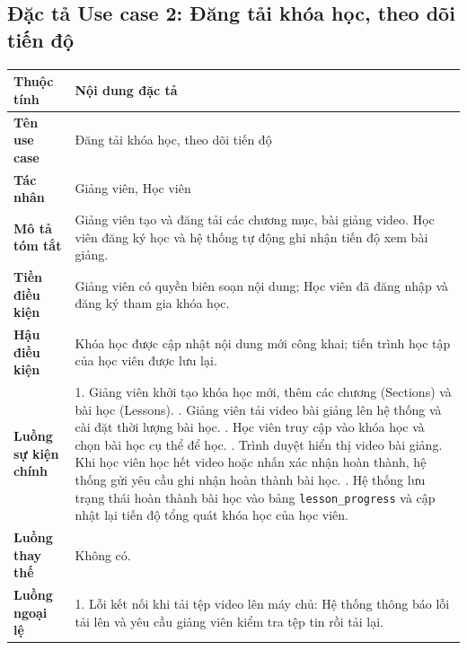 \documentclass[../DoAn.tex]{subfiles}
\begin{document}
\subsection{Đặc tả Use case 2: Đăng tải khóa học, theo dõi tiến độ}
\nopagebreak
\begingroup
\centering
\fontsize{11pt}{14pt}\selectfont
\begin{tabular}{|p{3.2cm}|p{10.8cm}|}
\hline
\textbf{Thuộc tính} & \textbf{Nội dung đặc tả} \\ \hline
\textbf{Tên use case} & Đăng tải khóa học, theo dõi tiến độ \\ \hline
\textbf{Tác nhân} & Giảng viên, Học viên \\ \hline
\textbf{Mô tả tóm tắt} & Giảng viên tạo và đăng tải các chương mục, bài giảng video. Học viên đăng ký học và hệ thống tự động ghi nhận tiến độ xem bài giảng. \\ \hline
\textbf{Tiền điều kiện} & Giảng viên có quyền biên soạn nội dung; Học viên đã đăng nhập và đăng ký tham gia khóa học. \\ \hline
\textbf{Hậu điều kiện} & Khóa học được cập nhật nội dung mới công khai; tiến trình học tập của học viên được lưu lại. \\ \hline
\textbf{Luồng sự kiện chính} & 
1. Giảng viên khởi tạo khóa học mới, thêm các chương (Sections) và bài học (Lessons). \newline
2. Giảng viên tải video bài giảng lên hệ thống và cài đặt thời lượng bài học. \newline
3. Học viên truy cập vào khóa học và chọn bài học cụ thể để học. \newline
4. Trình duyệt hiển thị video bài giảng. Khi học viên học hết video hoặc nhấn xác nhận hoàn thành, hệ thống gửi yêu cầu ghi nhận hoàn thành bài học. \newline
5. Hệ thống lưu trạng thái hoàn thành bài học vào bảng \texttt{lesson\_progress} và cập nhật lại tiến độ tổng quát khóa học của học viên. \\ \hline
\textbf{Luồng thay thế} & Không có. \\ \hline
\textbf{Luồng ngoại lệ} & 
1. Lỗi kết nối khi tải tệp video lên máy chủ: Hệ thống thông báo lỗi tải lên và yêu cầu giảng viên kiểm tra tệp tin rồi tải lại. \\ \hline
\end{tabular}
\label{table:uc_course_publish_progress}
\par
\endgroup
\end{document}
